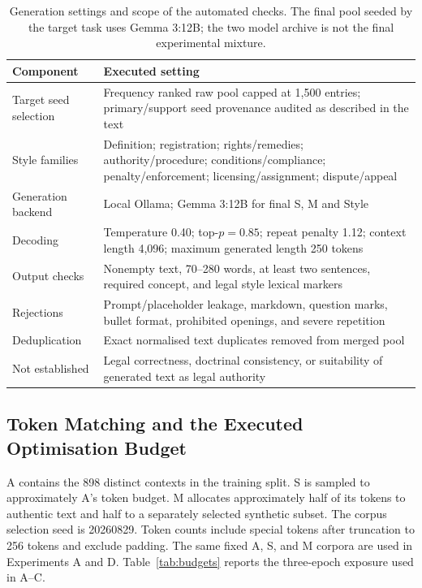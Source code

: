 \documentclass[pdflatex,sn-basic]{sn-jnl}
\begin{document}
\begin{table}[!htbp]
\caption{Generation settings and scope of the automated checks. The final
pool seeded by the target task uses Gemma 3:12B; the two model archive is not the final
experimental mixture.}
\label{tab:generation_settings}
\centering\small
\begin{tabular}{@{}>{\raggedright\arraybackslash}p{3.1cm}>{\raggedright\arraybackslash}p{8.2cm}@{}}
\toprule
Component & Executed setting \\
\midrule
Target seed selection & Frequency ranked raw pool capped at 1,500 entries;
primary/support seed provenance audited as described in the text \\
Style families & Definition; registration; rights/remedies; authority/procedure;
conditions/compliance; penalty/enforcement; licensing/assignment; dispute/appeal \\
Generation backend & Local Ollama; Gemma 3:12B for final S, M and Style \\
Decoding & Temperature 0.40; top-\(p=0.85\); repeat penalty 1.12;
context length 4,096; maximum generated length 250 tokens \\
Output checks & Nonempty text, 70--280 words, at least two sentences,
required concept, and legal style lexical markers \\
Rejections & Prompt/placeholder leakage, markdown, question marks, bullet
format, prohibited openings, and severe repetition \\
Deduplication & Exact normalised text duplicates removed from merged pool \\
Not established & Legal correctness, doctrinal consistency, or suitability
of generated text as legal authority \\
\bottomrule
\end{tabular}
\end{table}

\subsection{Token Matching and the Executed Optimisation Budget}

A contains the 898 distinct contexts in the training split. S is sampled
to approximately A's token budget. M allocates approximately half of its
tokens to authentic text and half to a separately selected synthetic subset.
The corpus selection seed is 20260829. Token counts include special tokens
after truncation to 256 tokens and exclude padding. The same fixed A, S, and M
corpora are used in Experiments A and D. Table~\ref{tab:budgets} reports the
three-epoch exposure used in A--C.
\end{document}
